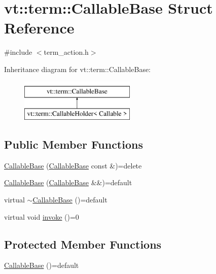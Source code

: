 \hypertarget{structvt_1_1term_1_1_callable_base}{}\section{vt\+:\+:term\+:\+:Callable\+Base Struct Reference}
\label{structvt_1_1term_1_1_callable_base}


{\ttfamily \#include $<$term\+\_\+action.\+h$>$}

Inheritance diagram for vt\+:\+:term\+:\+:Callable\+Base\+:\begin{figure}[H]
\begin{center}
\leavevmode
\includegraphics[height=2.000000cm]{structvt_1_1term_1_1_callable_base}
\end{center}
\end{figure}
\subsection*{Public Member Functions}
\begin{DoxyCompactItemize}
\item 
\hyperlink{structvt_1_1term_1_1_callable_base_a640500fd629bfc5187bc9f0a28a27dd1}{Callable\+Base} (\hyperlink{structvt_1_1term_1_1_callable_base}{Callable\+Base} const \&)=delete
\item 
\hyperlink{structvt_1_1term_1_1_callable_base_aacacdf848cfeaf66aae83124084721c7}{Callable\+Base} (\hyperlink{structvt_1_1term_1_1_callable_base}{Callable\+Base} \&\&)=default
\item 
virtual \hyperlink{structvt_1_1term_1_1_callable_base_a436cddd808a4935f2f1c78f85ff1f88b}{$\sim$\+Callable\+Base} ()=default
\item 
virtual void \hyperlink{structvt_1_1term_1_1_callable_base_a534f470aaf4dd168faa9adf3c91e6ca2}{invoke} ()=0
\end{DoxyCompactItemize}
\subsection*{Protected Member Functions}
\begin{DoxyCompactItemize}
\item 
\hyperlink{structvt_1_1term_1_1_callable_base_ab92dd683afcc403807330c93a9f5b0b9}{Callable\+Base} ()=default
\end{DoxyCompactItemize}


